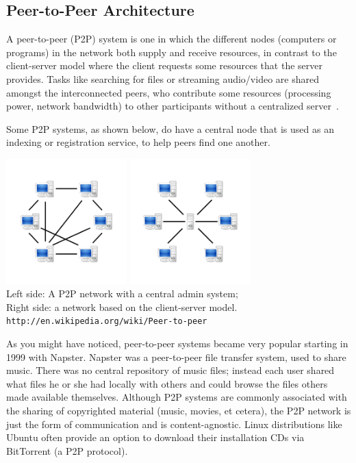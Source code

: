 \subsection*{Peer-to-Peer Architecture}
A peer-to-peer (P2P) system is one in which the different nodes (computers or programs) in the network both supply and receive resources, in contrast to the client-server model where the client requests some resources that the server provides. Tasks like searching for files or streaming audio/video are shared amongst the interconnected peers, who contribute some resources (processing power, network bandwidth) to other participants without a centralized server~\cite{p2p}.

Some P2P systems, as shown below, do have a central node that is used as an indexing or registration service, to help peers find one another.

\begin{center}
\includegraphics[width=0.35\textwidth]{images/p2pnetwork.png}
\includegraphics[width=0.35\textwidth]{images/serverbased.png}\\
Left side: A P2P network with a central admin system;\\
Right side: a network based on the client-server model.\\
\texttt{http://en.wikipedia.org/wiki/Peer-to-peer}
\end{center}

As you might have noticed, peer-to-peer systems became very popular starting in 1999 with Napster. Napster was a peer-to-peer file transfer system, used to share music. There was no central repository of music files; instead each user shared what files he or she had locally with others and could browse the files others made available themselves. Although P2P systems are commonly associated with the sharing of copyrighted material (music, movies, et cetera), the P2P network is just the form of communication and is content-agnostic. Linux distributions like Ubuntu often provide an option to download their installation CDs via BitTorrent (a P2P protocol).

